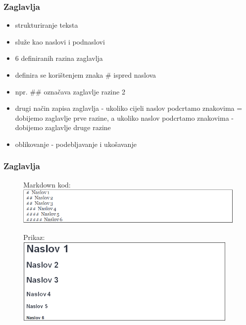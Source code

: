 \documentclass{beamer}
\begin{document}
\newpage

\begin{frame}
\frametitle{Zaglavlja}
\begin{itemize}
\item strukturiranje teksta
\item služe kao naslovi i podnaslovi
\item 6 definiranih razina zaglavlja
\item definira se korištenjem znaka \# ispred naslova
\item npr. \#\# označava zaglavlje razine 2
\item drugi način zapisa zaglavlja - ukoliko cijeli naslov podcrtamo znakovima = dobijemo zaglavlje prve razine, a ukoliko naslov podcrtamo znakovima - dobijemo zaglavlje druge razine 
\item oblikovanje - podebljavanje i ukošavanje
\end{itemize}
\end{frame}

\newpage

\begin{frame}
\frametitle{Zaglavlja}
\begin{figure}
{Markdown kod:} 
\includegraphics[width = 1.0\linewidth]{Zaglavlja.png}
\end{figure}

\begin{figure}
{Prikaz:}
\includegraphics[width = 1.0\linewidth, height = 120pt]{Prikaz_zaglavlja.png}
\end{figure}
\end{frame}

\newpage
\end{document}
